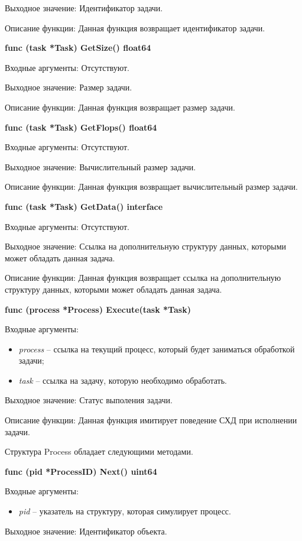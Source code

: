 Выходное значение: Идентификатор задачи. 

Описание функции: Данная функция возвращает идентификатор задачи.

\textbf{	func (task *Task) GetSize() float64 }

Входные аргументы: Отсутствуют.

Выходное значение: Размер задачи.

Описание функции: Данная функция возвращает размер задачи.

\textbf{	func (task *Task) GetFlops() float64}

Входные аргументы: Отсутствуют.

Выходное значение: Вычислительный размер задачи.

Описание функции: Данная функция возвращает вычислительный размер задачи.

\textbf{	func (task *Task) GetData() interface{} }

Входные аргументы: Отсутствуют.

Выходное значение: Ссылка на дополнительную структуру данных, которыми может обладать данная задача.

Описание функции: Данная функция возвращает ссылка на дополнительную структуру данных, которыми может обладать данная задача.

\textbf{	func (process *Process) Execute(task *Task) }

Входные аргументы:
\begin{itemize}
	\item \textit{process} -- ссылка на текущий процесс, который будет заниматься обработкой задачи; 
	\item \textit{task} -- ссылка на задачу, которую необходимо обработать.
\end{itemize}

Выходное значение: Статус выполения задачи.

Описание функции: Данная функция имитирует поведение СХД при исполнении задачи.


Структура Process обладает следующими методами.

\textbf{func (pid *ProcessID) Next() uint64}

Входные аргументы: 
\begin{itemize}
	\item \textit{pid} -- указатель на структуру, которая симулирует процесс.
\end{itemize}

Выходное значение: Идентификатор объекта.

